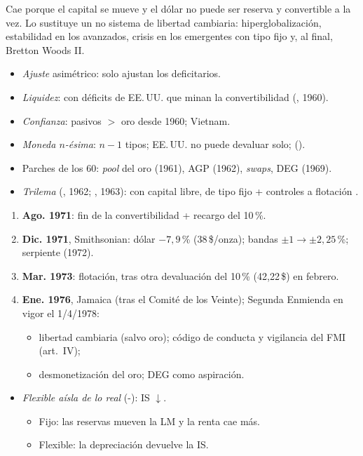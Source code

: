 \documentclass{article}
\begin{document}
\begin{columnas}
\begin{ideaclave}
Cae porque el capital se mueve y el dólar no puede ser reserva y convertible a la vez. Lo sustituye un no sistema de libertad cambiaria: hiperglobalización, estabilidad en los avanzados, crisis en los emergentes con tipo fijo y, al final, Bretton Woods II.
\end{ideaclave}

\begin{itemize}
\item \emph{Ajuste} asimétrico: solo ajustan los deficitarios.
\item \emph{Liquidez}: con déficits de EE.\,UU. que minan la convertibilidad (, 1960).
\item \emph{Confianza}: pasivos $>$ oro desde 1960; Vietnam.
\item \emph{Moneda $n$-ésima}: $n-1$ tipos; EE.\,UU. no puede devaluar solo;  ().
\item Parches de los 60: \emph{pool} del oro (1961), AGP (1962), \emph{swaps}, DEG (1969).
\item \emph{Trilema} (, 1962; , 1963): con capital libre, de tipo fijo + controles a flotación .
\end{itemize}
\begin{enumerate}
\item \textbf{Ago. 1971}: fin de la convertibilidad + recargo del 10\,\%.
\item \textbf{Dic. 1971}, Smithsonian: dólar $-7{,}9$\,\% (38\,\$/onza); bandas $\pm1\to\pm2{,}25$\,\%; serpiente (1972).
\item \textbf{Mar. 1973}: flotación, tras otra devaluación del 10\,\% (42,22\,\$) en febrero.
\item \textbf{Ene. 1976}, Jamaica (tras el Comité de los Veinte); Segunda Enmienda en vigor el 1/4/1978:
  \begin{itemize}
  \item libertad cambiaria (salvo oro); código de conducta y vigilancia del FMI (art.~IV);
  \item desmonetización del oro; DEG como aspiración.
  \end{itemize}
\end{enumerate}
\begin{itemize}
\item \emph{Flexible aísla de lo real} (-): IS $\downarrow$.
  \begin{itemize}
  \item Fijo: las reservas mueven la LM y la renta cae más.
  \item Flexible: la depreciación devuelve la IS.
  \end{itemize}
\end{itemize}


\end{columnas}
\end{document}
